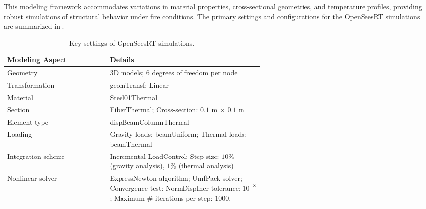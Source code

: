 {This modeling framework accommodates variations in material properties, cross-sectional geometries, and temperature profiles, providing robust simulations of structural behavior under fire conditions. The primary settings and configurations for the OpenSeesRT simulations are summarized in .
\begin{table}[h!]
    \centering
        \caption{Key settings of OpenSeesRT simulations.}
    \begin{tabular}{l|>{\raggedright\arraybackslash}p{0.6\linewidth}} %
    \toprule
    Modeling Aspect     & Details \\
    \midrule
    Geometry            & 3D models; 6 degrees of freedom per node \\
    Transformation      & geomTransf: Linear \\ 
    Material            & Steel01Thermal \\
    Section             & FiberThermal; Cross-section: $0.1$ m $\times$ $0.1$ m \\ 
    Element type        & {dispBeamColumnThermal} \\ 
    Loading             & Gravity loads: {beamUniform}; Thermal loads: {beamThermal} \\
    Integration scheme  & Incremental {LoadControl}; Step size: $10\%$ (gravity analysis), $1\%$ (thermal analysis) \\
    Nonlinear solver    & {ExpressNewton} algorithm; {UmfPack} solver; Convergence test: {NormDispIncr} tolerance: $10^{-8}$; Maximum \# iterations per step: $1000$. \\ 
    \bottomrule
    \end{tabular}
    \label{tab:ops_detail}
\end{table}

}
